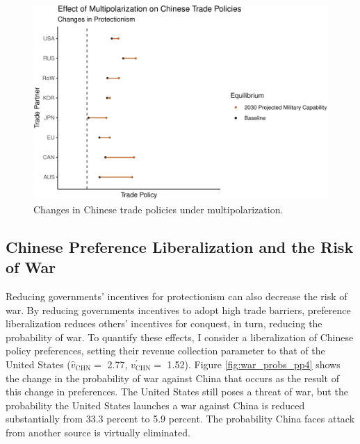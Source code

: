 \documentclass{puthesis}
\begin{document}
\begin{figure}
\centering
\includegraphics{figure/cfct2_tau-1.pdf}
\caption{Changes in Chinese trade policies under multipolarization.
\label{fig:cfct2_tau}}
\end{figure}

\subsection{Chinese Preference Liberalization and the Risk of War}

Reducing governments' incentives for protectionism can also decrease the
risk of war. By reducing governments incentives to adopt high trade
barriers, preference liberalization reduces others' incentives for
conquest, in turn, reducing the probability of war. To quantify these
effects, I consider a liberalization of Chinese policy preferences,
setting their revenue collection parameter to that of the United States
(\(\hat{v}_{\text{CHN}}=\) 2.77, \(v_{\text{CHN}}^\prime=\) 1.52).
Figure \ref{fig:war_probs_pp4} shows the change in the probability of
war against China that occurs as the result of this change in
preferences. The United States still poses a threat of war, but the
probability the United States launches a war against China is reduced
substantially from 33.3 percent to 5.9 percent. The probability China
faces attack from another source is virtually eliminated.
\end{document}
